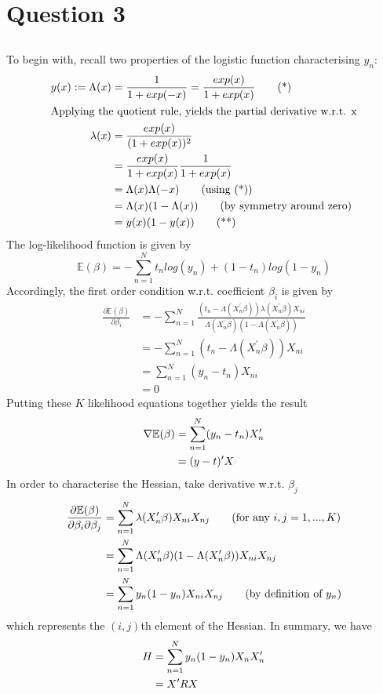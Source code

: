 \documentclass{article}
\begin{document}
\section{Question 3}
\subsection{}
To begin with, recall two properties of the logistic function characterising $y_n$:
\begin{align*}
y(x) := \Lambda(x) &= \frac{1}{1 + exp(-x)} = \frac{exp(x)}{1 + exp(x)} \tag{*} \\
\intertext{Applying the quotient rule, yields the partial derivative w.r.t. x}
\lambda(x) &= \frac{exp(x)}{(1 + exp(x))^2} \notag \\
&= \frac{exp(x)}{1 + exp(x)} \frac{1}{1 + exp(x)} \notag \\
&= \Lambda(x) \Lambda(-x) \tag{using (*)} \\
&= \Lambda(x) (1 - \Lambda(x)) \tag{by symmetry around zero} \\
&= y(x) (1 - y(x)) \tag{**}
\end{align*}
The log-likelihood function is given by
\begin{equation*}
\mathbb{E}(\beta) = - \sum_{n=1}^N t_n log(y_n) + (1-t_n) log(1 - y_n)
\end{equation*}
Accordingly, the first order condition w.r.t. coefficient $\beta_i$ is given by
\begin{align*}
\frac{\partial\mathbb{E}(\beta)}{\partial \beta_i} &= - \sum_{n=1}^N \frac{(t_n - \Lambda(X_n^{\prime}\beta)) \lambda(X_n^{\prime}\beta) X_{ni}}{\Lambda(X_n^{\prime}\beta) (1 - \Lambda(X_n^{\prime}\beta))} \tag{for $i = 1,...,K$} \\
&= - \sum_{n=1}^N (t_n - \Lambda(X_n^{\prime}\beta)) X_{ni} \tag{using (**} \\
&= \sum_{n=1}^N (y_n - t_n) X_{ni} \tag{by definition of $y_n$} \\
&= 0 \tag{for i = 1,...,K}
\end{align*}
Putting these $K$ likelihood equations together yields the result
\begin{align*}
\nabla \mathbb{E}(\beta) &= \sum_{n=1}^N (y_n - t_n) X_n^\prime \notag\\
&= (y - t)^\prime X
\end{align*}
In order to characterise the Hessian, take derivative w.r.t. $\beta_j$
\begin{align*}
\frac{\partial\mathbb{E}(\beta)}{\partial \beta_i \partial \beta_j} &= \sum_{n=1}^N \lambda(X_n^{\prime}\beta) X_{ni} X_{nj} \tag{for any $i,j = 1,...,K$} \\
&= \sum_{n=1}^N \Lambda(X_n^{\prime}\beta) (1 - \Lambda(X_n^{\prime}\beta)) X_{ni} X_{nj} \notag \\
&= \sum_{n=1}^N y_n (1 - y_n) X_{ni} X_{nj} \tag{by definition of $y_n$}
\end{align*}
which represents the $(i,j)$th element of the Hessian. In summary, we have
\begin{align*}
H &= \sum_{n=1}^N y_n (1 - y_n) X_{n} X_{n}^\prime \notag \\
&= X^\prime R X \notag
\end{align*}
\end{document}
